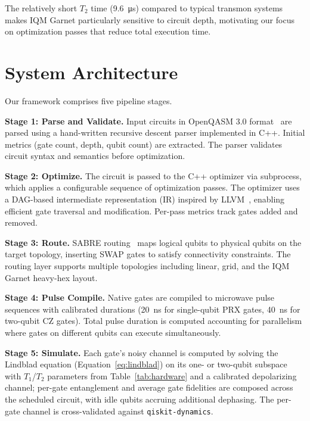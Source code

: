 \documentclass[sigconf,nonacm]{acmart}
\begin{document}
The relatively short $T_2$ time (\SI{9.6}{\micro\second}) compared to typical transmon systems makes IQM Garnet particularly sensitive to circuit depth, motivating our focus on optimization passes that reduce total execution time.

\section{System Architecture}
\label{sec:architecture}

Our framework comprises five pipeline stages.

\textbf{Stage 1: Parse and Validate.} Input circuits in OpenQASM 3.0 format~\cite{cross2022openqasm3} are parsed using a hand-written recursive descent parser implemented in C++. Initial metrics (gate count, depth, qubit count) are extracted. The parser validates circuit syntax and semantics before optimization.

\textbf{Stage 2: Optimize.} The circuit is passed to the C++ optimizer via subprocess, which applies a configurable sequence of optimization passes. The optimizer uses a DAG-based intermediate representation (IR) inspired by LLVM~\cite{lattner2004llvm}, enabling efficient gate traversal and modification. Per-pass metrics track gates added and removed.

\textbf{Stage 3: Route.} SABRE routing~\cite{li2019tackling} maps logical qubits to physical qubits on the target topology, inserting SWAP gates to satisfy connectivity constraints. The routing layer supports multiple topologies including linear, grid, and the IQM Garnet heavy-hex layout.

\textbf{Stage 4: Pulse Compile.} Native gates are compiled to microwave pulse sequences with calibrated durations (\SI{20}{\nano\second} for single-qubit PRX gates, \SI{40}{\nano\second} for two-qubit CZ gates). Total pulse duration is computed accounting for parallelism where gates on different qubits can execute simultaneously.

\textbf{Stage 5: Simulate.} Each gate's noisy channel is computed by solving the Lindblad equation (Equation~\ref{eq:lindblad}) on its one- or two-qubit subspace with $T_1$/$T_2$ parameters from Table~\ref{tab:hardware} and a calibrated depolarizing channel; per-gate entanglement and average gate fidelities are composed across the scheduled circuit, with idle qubits accruing additional dephasing. The per-gate channel is cross-validated against \texttt{qiskit-dynamics}.
\end{document}
